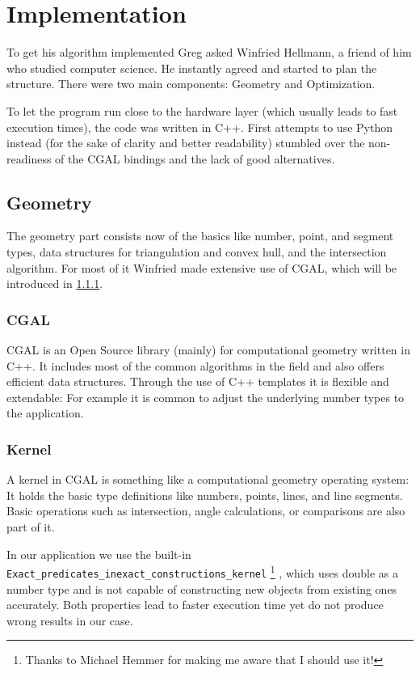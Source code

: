 \chapter{Implementation}
To get his algorithm implemented Greg asked Winfried Hellmann, a
friend of him who studied computer science. He instantly agreed and
started to plan the structure. There were two main components:
Geometry and Optimization.

To let the program run close to the hardware layer (which usually
leads to fast execution times), the code was written in C++. First
attempts to use Python instead (for the sake of clarity and better
readability) stumbled over the non-readiness of the CGAL bindings and
the lack of good alternatives.

\section{Geometry}
The geometry part consists now of the basics like number, point, and
segment types, data structures for triangulation and convex hull, and
the intersection algorithm. For most of it Winfried made extensive use
of CGAL, which will be introduced in \cref{sec:CGAL}.

\subsection{CGAL}\label{sec:CGAL}
CGAL \cite{cgal} is an Open Source library (mainly) for computational
geometry written in C++. It includes most of the common algorithms in
the field and also offers efficient data structures. Through the use
of C++ templates it is flexible and extendable: For example it is
common to adjust the underlying number types to the application.

\subsection{Kernel}
A kernel in CGAL is something like a computational geometry operating
system: It holds the basic type definitions like numbers, points,
lines, and line segments. Basic operations such as intersection,
angle calculations, or comparisons are also part of it.

In our application we use the built-in 
\verb|Exact_predicates_inexact_constructions_kernel|%
\footnote{Thanks to Michael Hemmer for making me aware that I should
use it!} \cite{cgal_manual_epick}, which uses double as a number type
and is not capable of
constructing new objects from existing ones accurately. Both
properties lead to faster execution time yet do not produce wrong
results in our case.

